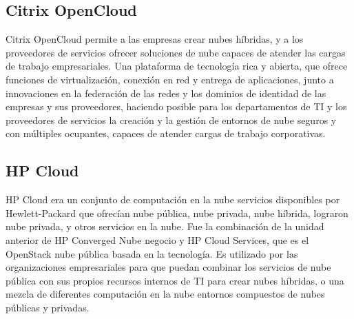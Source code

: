 \subsection{Citrix OpenCloud}
Citrix OpenCloud permite a las empresas crear nubes híbridas, y a los proveedores de servicios ofrecer soluciones de nube capaces de atender las cargas de trabajo empresariales. Una plataforma de tecnología rica y abierta, que ofrece funciones de virtualización, conexión en red y entrega de aplicaciones, junto a innovaciones en la federación de las redes y los dominios de identidad de las empresas y sus proveedores, haciendo posible para los departamentos de TI y los proveedores de servicios la creación y la gestión de entornos de nube seguros y con múltiples ocupantes, capaces de atender cargas de trabajo corporativas.

\subsection{HP Cloud}
HP Cloud era un conjunto de computación en la nube servicios disponibles por Hewlett-Packard que ofrecían nube pública, nube privada, nube híbrida, lograron nube privada, y otros servicios en la nube. Fue la combinación de la unidad anterior de HP Converged Nube negocio y HP Cloud Services, que es el OpenStack nube pública basada en la tecnología. Es utilizado por las organizaciones empresariales para que puedan combinar los servicios de nube pública con sus propios recursos internos de TI para crear nubes híbridas, o una mezcla de diferentes computación en la nube entornos compuestos de nubes públicas y privadas.

